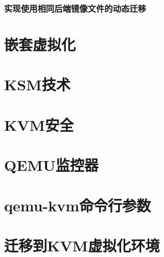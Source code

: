 \documentclass[a4paper,left=2.5cm,right=2.5cm,11pt]{article}
\begin{document}
\subsubsection{实现使用相同后端镜像文件的动态迁移}

\section{嵌套虚拟化}
\section{KSM技术}
\section{KVM安全}
\section{QEMU监控器}
\section{qemu-kvm命令行参数}
\section{迁移到KVM虚拟化环境} 
\end{document}
